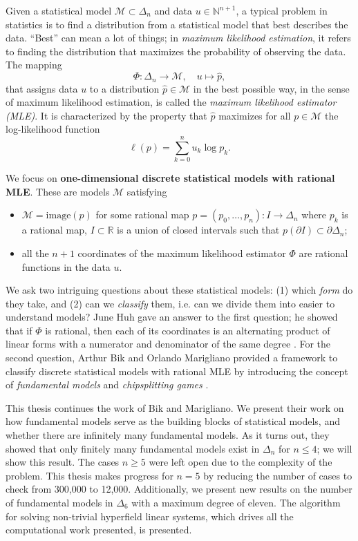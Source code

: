 Given a statistical model \( \mathcal{M} \subset \Delta_n \) and data \( u \in \mathbb{N}^{n+1} \), a typical problem in statistics is to find a distribution from a statistical model that best describes the data. ``Best'' can mean a lot of things; in \emph{maximum likelihood estimation}, it refers to finding the distribution that maximizes the probability of observing the data. The mapping
\[
\Phi: \Delta_n \to \mathcal{M}, \quad u \mapsto \hat{p},
\]
that assigns data \( u \) to a distribution \( \hat{p} \in \mathcal{M} \) in the best possible way, in the sense of maximum likelihood estimation, is called the \emph{maximum likelihood estimator (MLE)}. It is characterized by the property that \( \hat{p} \) maximizes for all \( p \in \mathcal{M} \) the log-likelihood function
\[
\ell(p) = \sum_{k=0}^n u_k \log p_k.
\]

We focus on \textbf{{one-dimensional {discrete} {statistical} {models} with rational MLE}}. These are models \( \mathcal{M} \) satisfying 
\begin{itemize}
    \item \( \mathcal{M} = \mathrm{image}(p) \) for some rational map \( p = (p_0, \dots, p_n): I \to \Delta_n \) where \( p_k \) is a rational map, \( I \subset \mathbb{R} \) is a union of closed intervals such that  \( p(\partial I) \subset \partial \Delta_n \);
    \item all the \( n+1 \) coordinates of the maximum likelihood estimator \( \Phi \) are rational functions in the data \( u \).
\end{itemize}

We ask two intriguing questions about these statistical models: (1) which \emph{form} do they take, and (2) can we \emph{classify} them, i.e. can we divide them into easier to understand models? June Huh gave an answer to the first question; he showed that if \( \Phi \) is rational, then each of its coordinates is an alternating product of linear forms with a numerator and denominator of the same degree \cite{huh2013varieties, huh2013maximum, duarte2021discrete}. For the second question, Arthur Bik and Orlando Marigliano provided a framework to classify discrete statistical models with rational MLE by introducing the concept of \emph{fundamental models} and \emph{chipsplitting games} \cite{bik2022classifying}.

This thesis continues the work of Bik and Marigliano. We present their work on how fundamental models serve as the building blocks of statistical models, and whether there are infinitely many fundamental models. As it turns out, they showed that only finitely many fundamental models exist in \( \Delta_n \) for \( n \leq 4 \); we will show this result. The cases \( n \geq 5 \) were left open due to the complexity of the problem. This thesis makes progress for \( n = 5 \) by reducing the number of cases to check from 300,000 to 12,000. Additionally, we present new results on the number of fundamental models in \( \Delta_6 \) with a maximum degree of eleven. The algorithm for solving non-trivial hyperfield linear systems, which drives all the computational work presented, is presented.

